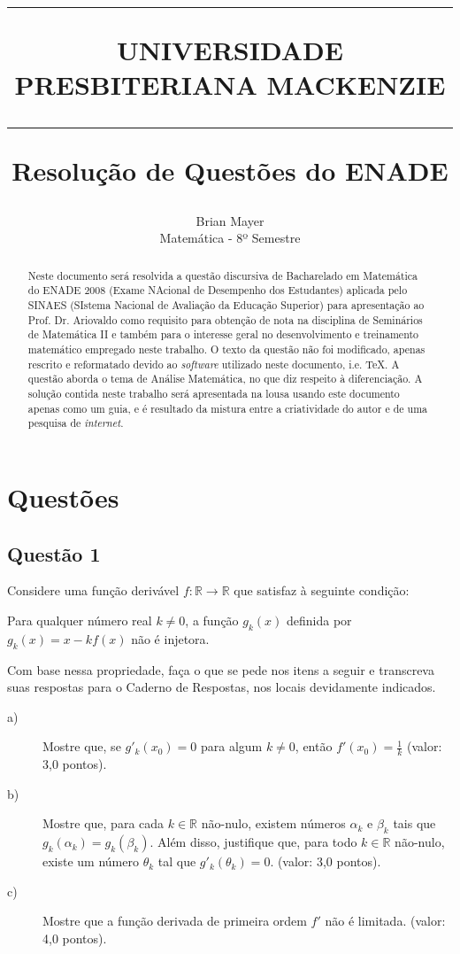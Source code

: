 \documentclass[12pt]{article}
\title{\hrule \vspace{11pt} \Large{\color{red} UNIVERSIDADE PRESBITERIANA MACKENZIE} \vspace{10pt}\\
\hrule \vspace{60pt}
\color{blue} Resolução de Questões do ENADE}
\author{Brian Mayer\\
\color{red} Matemática - 8º Semestre}
\date{}
\begin{document}
\maketitle

\begin{abstract}
Neste documento será resolvida a questão discursiva de Bacharelado em Matemática do ENADE 2008 (Exame NAcional de Desempenho dos Estudantes) aplicada pelo SINAES (SIstema Nacional de Avaliação da Educação Superior) para apresentação ao Prof. Dr. Ariovaldo como requisito para obtenção de nota na disciplina de Seminários de Matemática II e também para o interesse geral no desenvolvimento e treinamento matemático empregado neste trabalho. O texto da questão não foi modificado, apenas rescrito e reformatado devido ao \emph{software} utilizado neste documento, i.e. \TeX. A questão aborda o tema de Análise Matemática, no que diz respeito à diferenciação. A solução contida neste trabalho será apresentada na lousa usando este documento apenas como um guia, e é resultado da mistura entre a criatividade do autor e de uma pesquisa de \emph{internet}.
\end{abstract}

\newpage

\section*{\color{blue} Questões}

\subsection*{\color{blue} Questão 1}

Considere uma função derivável $f: \mathbb{R} \to \mathbb{R}$ que satisfaz à seguinte condição:

Para qualquer número real $k\neq 0$, a função $g_k (x)$ definida por $g_k (x)=x-kf(x)$ não é injetora.

Com base nessa propriedade, faça o que se pede nos itens a seguir e transcreva suas respostas para o Caderno de Respostas, nos locais devidamente indicados.

\begin{description}

\item[a)] Mostre que, se $g'_k(x_0)=0$ para algum $k\neq 0$, então $f' (x_0)=\frac1{k}$ (valor: 3,0 pontos).

\item[b)] Mostre que, para cada $k \in \mathbb{R}$ não-nulo, existem números $\alpha_k$ e $\beta_k$ tais que $g_k(\alpha_k) = g_k(\beta_k)$. Além disso, justifique que, para todo $k \in \mathbb{R}$ não-nulo, existe um número $\theta_k$ tal que $g'_k(\theta_k)=0$. (valor: 3,0 pontos).

\item[c)] Mostre que a função derivada de primeira ordem $f'$ não é limitada. (valor: 4,0 pontos).


\end{description}
\end{document}
